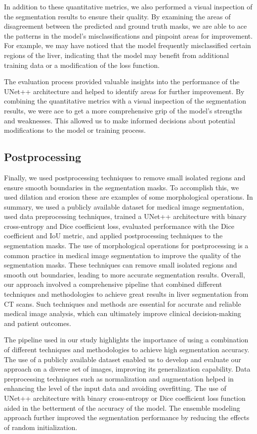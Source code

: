 \documentclass[conference]{IEEEtran}
\begin{document}
In addition to these quantitative metrics, we also performed a visual inspection of the segmentation results to ensure their quality. By examining the areas of disagreement between the predicted and ground truth masks, we are able to ace the patterns in the model's misclassifications and pinpoint areas for improvement. For example, we may have noticed that the model frequently misclassified certain regions of the liver, indicating that the model may benefit from additional training data or a modification of the loss function.

The evaluation process provided valuable insights into the performance of the UNet++ architecture and helped to identify areas for further improvement. By combining the quantitative metrics with a visual inspection of the segmentation results, we were ace to get a more comprehensive grip of the model's strengths and weaknesses. This allowed us to make informed decisions about potential modifications to the model or training process.

\subsection{Postprocessing}\label{SCM}
Finally, we used postprocessing techniques to remove small isolated regions and ensure smooth boundaries in the segmentation masks. To accomplish this, we used dilation and erosion these are examples of some morphological operations. In summary, we used a publicly available dataset for medical image segmentation, used data preprocessing techniques, trained a UNet++ architecture with binary cross-entropy and Dice coefficient loss, evaluated performance with the Dice coefficient and IoU metric, and applied postprocessing techniques to the segmentation masks.
The use of morphological operations for postprocessing is a common practice in medical image segmentation to improve the quality of the segmentation masks. These techniques can remove small isolated regions and smooth out boundaries, leading to more accurate segmentation results. Overall, our approach involved a comprehensive pipeline that combined different techniques and methodologies to achieve great results in liver segmentation from CT scans. Such techniques and methods are essential for accurate and reliable medical image analysis, which can ultimately improve clinical decision-making and patient outcomes.

The pipeline used in our study highlights the importance of using a combination of different techniques and methodologies to achieve high segmentation accuracy. The use of a publicly available dataset enabled us to develop and evaluate our approach on a diverse set of images, improving its generalization capability. Data preprocessing techniques such as normalization and augmentation helped in enhancing the level of the input data and avoiding overfitting. The use of UNet++ architecture with binary cross-entropy or Dice coefficient loss function aided in the betterment of the accuracy of the model. The ensemble modeling approach further improved the segmentation performance by reducing the effects of random initialization.
\end{document}
